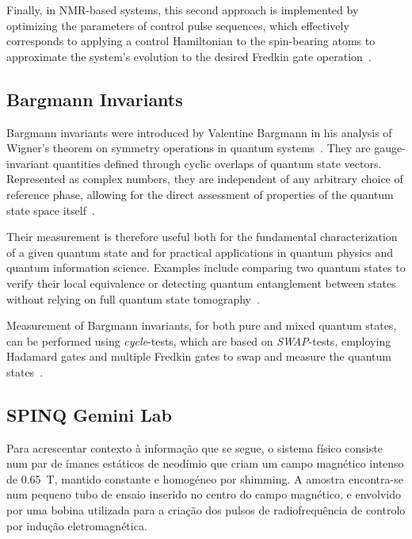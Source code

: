 Finally, in NMR-based systems, this second approach is implemented by optimizing the parameters of control pulse sequences, which effectively corresponds to applying a control Hamiltonian to the spin-bearing atoms to approximate the system’s evolution to the desired Fredkin gate operation~\cite{Devra2018Efficient}.

\subsection{Bargmann Invariants}

Bargmann invariants were introduced by Valentine Bargmann in his analysis of Wigner’s theorem on symmetry operations in quantum systems~\cite{bargmann1964note}. They are gauge-invariant quantities defined through cyclic overlaps of quantum state vectors. Represented as complex numbers, they are independent of any arbitrary choice of reference phase, allowing for the direct assessment of properties of the quantum state space itself~\cite{Pratapsi2025elementary, zhang2026survey}.

Their measurement is therefore useful both for the fundamental characterization of a given quantum state and for practical applications in quantum physics and quantum information science. Examples include comparing two quantum states to verify their local equivalence or detecting quantum entanglement between states without relying on full quantum state tomography~\cite{zhang2025bargmannentanglement}.

Measurement of Bargmann invariants, for both pure and mixed quantum states, can be performed using \emph{cycle}-tests, which are based on \emph{SWAP}-tests, employing Hadamard gates and multiple Fredkin gates to swap and measure the quantum states~\cite{oszmaniec2021measuringrelationalinformationquantum}.



\subsection{SPINQ Gemini Lab}

Para acrescentar contexto à informação que se segue, o sistema físico consiste num par de ímanes estáticos de neodímio que criam um campo magnético intenso de \SI{0.65}{\tesla}, mantido constante e homogéneo por shimming. A amostra encontra-se num pequeno tubo de ensaio inserido no centro do campo magnético, e envolvido por uma bobina utilizada para a criação dos pulsos de radiofrequência de controlo por indução eletromagnética.

